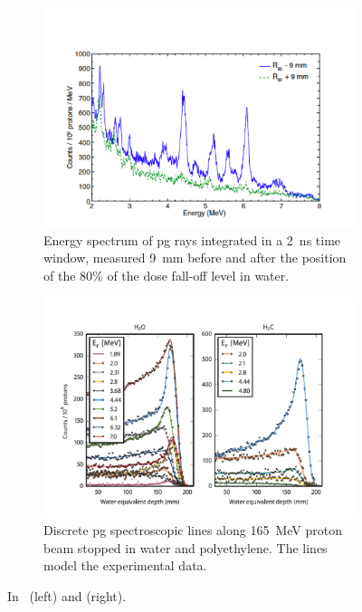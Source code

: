 \begin{figure}
\centering
\begin{subfigure}[t]{.49\textwidth}
\hspace{-0.7cm}\includegraphics[width=1.2\linewidth, trim = {0 0 0 4cm}, clip]{03_GraphicFiles/chapter2_GammaCameras/PGS_spectrum.pdf}
\caption{Energy spectrum of \gls{pg} rays integrated in a 2~ns time window, measured 9~mm before and after the position of the 80\% of the dose fall-off level in water.}
\label{chap2::fig::PGS_spectrum}
\end{subfigure}
\begin{subfigure}[t]{.49\textwidth}
\hspace{-0.7cm}\includegraphics[width=1.2\linewidth]{03_GraphicFiles/chapter2_GammaCameras/PGS_range.pdf}
\caption{Discrete \gls{pg} spectroscopic lines along 165~MeV proton  beam stopped in water and polyethylene. The lines model the experimental data.}
\label{chap2::fig::PGS_range}
\end{subfigure}
\caption{In~\cite{Verburg2013} (left) and \cite{Verburg2014} (right).}
\label{chap2::fig::PGS_composition}
\end{figure}

